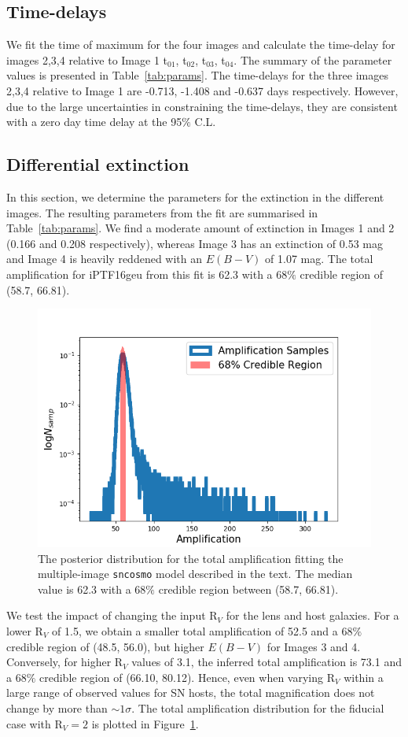 \documentclass[a4paper,fleqn,usenatbib]{mnras}
\begin{document}




\subsection{Time-delays}
\label{ssec-time_delay}
We fit the time of maximum for the four images and calculate the time-delay for images 2,3,4 relative to Image 1  t$_{01}$, t$_{02}$, t$_{03}$, t$_{04}$. The summary of the parameter values is presented in Table~\ref{tab:params}. The time-delays for the three images 2,3,4 relative to Image 1 are -0.713, -1.408 and -0.637 days respectively. However, due to the large uncertainties in constraining the time-delays, they are consistent with a zero day time delay at the 95$\%$ C.L. 

\subsection{Differential extinction}
\label{ssec-extinction}
In this section, we determine the parameters for the extinction in the different images. The resulting parameters from the fit are summarised in Table~\ref{tab:params}. We find a moderate amount of extinction in Images 1 and 2 (0.166 and 0.208 respectively), whereas Image 3 has an extinction of 0.53 mag and Image 4 is heavily reddened with an $E(B-V)$ of 1.07 mag. The total amplification for iPTF16geu from this fit is 62.3 with a 68$\%$ credible region of (58.7, 66.81).

\begin{figure}
    \centering
    \includegraphics[width=.5\textwidth]{amplif_dist_forpaper.png}
    \caption{The posterior distribution for the total amplification fitting the multiple-image \texttt{sncosmo} model described in the text. The median value is 62.3 with a 68$\%$ credible region between (58.7, 66.81).}
    \label{fig:amp}
\end{figure}

We test the impact of changing the input R$_V$ for the lens and host galaxies. For a lower R$_V$ of 1.5, we obtain a smaller total amplification of 52.5 and a 68$\%$ credible region of (48.5, 56.0), but higher $E(B-V)$ for Images 3 and 4. Conversely, for higher R$_V$ values of 3.1, the inferred total amplification is 73.1 and a 68$\%$ credible region of (66.10, 80.12). Hence, even when varying R$_V$ within a large range of observed values for SN hosts, the total magnification does not change by more than $\sim 1 \sigma$.
The total amplification distribution for the fiducial case with R$_V = 2$ is plotted in Figure~\ref{fig:amp}. 
\end{document}
